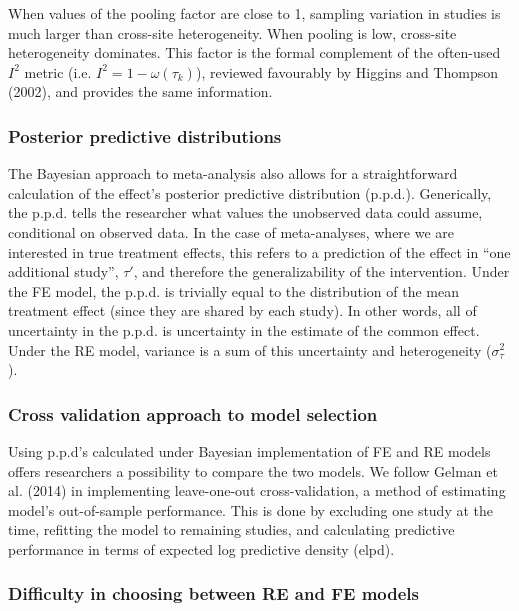 \documentclass[12pt]{article}
\begin{document}
When values of the pooling factor are close to 1, sampling variation in studies is much larger than cross-site heterogeneity. When pooling is low, cross-site heterogeneity dominates. This factor is the formal complement of the often-used $I^2$ metric (i.e. $I^2 = 1- \omega(\tau_k)$), reviewed favourably by Higgins and Thompson (2002), and provides the same information. 


\subsubsection*{Posterior predictive distributions}

The Bayesian approach to meta-analysis also allows for a straightforward calculation of the effect's posterior predictive distribution (p.p.d.). Generically, the p.p.d. tells the researcher what values the unobserved data could assume, conditional on observed data. In the case of meta-analyses, where we are interested in true treatment effects, this refers to a prediction of the effect in ``one additional study'', $\tau'$, and therefore the generalizability of the intervention. Under the FE model, the p.p.d. is trivially equal to the distribution of the mean treatment effect (since they are shared by each study). In other words, all of uncertainty in the p.p.d. is uncertainty in the estimate of the common effect. Under the RE model, variance is a sum of this uncertainty and heterogeneity ($\sigma_\tau^2$). 

\subsubsection*{Cross validation approach to model selection}

Using p.p.d's calculated under Bayesian implementation of FE and RE models offers researchers a possibility to compare the two models. We follow Gelman et al. (2014) in implementing leave-one-out cross-validation, a method of estimating model's out-of-sample performance. This is done by excluding one study at the time, refitting the model to remaining studies, and calculating predictive performance in terms of expected log predictive density (elpd).

\subsubsection*{Difficulty in choosing between RE and FE models}
\end{document}
